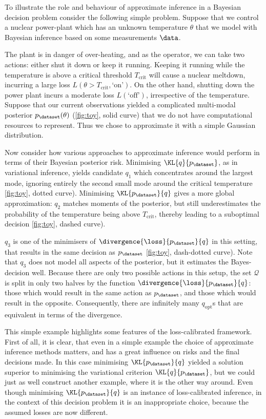 To illustrate the role and behaviour of approximate inference in a Bayesian decision problem consider the following simple problem. Suppose that we control a nuclear power-plant which has an unknown temperature $\theta$ that we model with Bayesian inference based on some measurements $\data$.

The plant is in danger of over-heating, and as the operator, we can take two actions: either shut it down or keep it running. Keeping it running while the temperature is above a critical threshold $T_\mathrm{crit}$ will cause a nuclear meltdown, incurring a large loss $L(\theta>T_\mathrm{crit},\mbox{`on'})$. On the other hand, shutting down the power plant incurs a moderate loss $L(\mbox{`off'})$, irrespective of the temperature. 
Suppose that our current observations yielded a complicated multi-modal posterior $p_\dataset(\theta)$ (\ref{fig:toy}, solid curve) that we do not have computational resources to represent. Thus we chose to approximate it with a simple Gaussian distribution.

Now consider how various approaches to approximate inference would perform in terms of their Bayesian posterior risk. Minimising $\KL{q}{p_\dataset}$, as in variational inference, yields candidate $q_1$ which concentrates around the largest mode, ignoring entirely the second small mode around the critical temperature \ref{fig:toy}, dotted curve). Minimising $\KL{p_\dataset}{q}$ gives a more global approximation: $q_2$ matches moments of the posterior, but still underestimates the probability of the temperature being above $T_\mathrm{crit}$, thereby leading to a suboptimal decision \ref{fig:toy}, dashed curve).

$q_3$ is one of the minimisers of $\divergence{\loss}{p_\dataset}{q}$ in this setting, that results in the same decision as $p_\dataset$ \ref{fig:toy}, dash-dotted curve). Note that $q_3$ does not model all aspects of the posterior, but it estimates the Bayes-decision well. Because there are only two possible actions in this setup, the set $\mathcal{Q}$ is split in only two halves by the function $\divergence{\loss}{p_\dataset}{q}$: those which would result in the same action as $p_{\dataset}$, and those which would result in the opposite. Consequently, there are infinitely many $q_\mathrm{opt}$s that are equivalent in terms of the divergence.

This simple example highlights some features of the loss-calibrated framework. First of all, it is clear, that even in a simple example the choice of approximate inference methods matters, and has a great influence on risks and the final decisions made. In this case minimising $\KL{p_\dataset}{q}$ yielded a solution superior to minimising the variational criterion $\KL{q}{p_\dataset}$, but we could just as well construct another example, where it is the other way around. Even though minimising $\KL{p_\dataset}{q}$ is an instance of loss-calibrated inference, in the context of this decision problem it is an inappropriate choice, because the assumed losses are now different.

